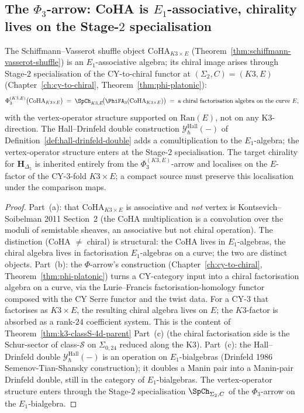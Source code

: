 \subsection{The \texorpdfstring{$\Phi_3$}{Phi-3}-arrow: CoHA is $E_1$-associative, chirality lives on the Stage-$2$ specialisation}
\label{subsec:kcb-phi-discipline}

\begin{theorem}
\label{thm:kcb-phi-arrow-discipline}
The Schiffmann--Vasserot shuffle object
$\mathrm{CoHA}_{K3\times E}$ (Theorem~\ref{thm:schiffmann-vasserot-shuffle})
is an $E_1$-associative algebra; its chiral image arises through
Stage-$2$ specialisation of the CY-to-chiral functor at
$(\Sigma_2, C) = (K3, E)$ (Chapter~\ref{ch:cy-to-chiral},
Theorem~\ref{thm:phi-platonic}):
\[
 \Phi_3^{(K3, E)}\bigl(\mathrm{CoHA}_{K3\times E}\bigr)
 \;=\;
 \SpCh_{K3, E}\!\bigl(\PhiFA_3(\mathrm{CoHA}_{K3\times E})\bigr)
 \;=\;
 \text{a chiral factorisation algebra on the curve }E,
\]
with the vertex-operator structure supported on $\mathrm{Ran}(E)$,
not on any K3-direction. The Hall--Drinfeld double construction
$\mathcal{Y}^{\mathrm{Hall}}_\hbar(-)$ of
Definition~\ref{def:hall-drinfeld-double} adds a comultiplication to
the $E_1$-algebra; the vertex-operator structure enters at the
Stage-$2$ specialisation. The target chirality for
$\mathbf{H}_{\Delta_5}$ is inherited entirely from the
$\Phi_3^{(K3, E)}$-arrow and localises on the $E$-factor of the
CY-$3$-fold $K3\times E$; a compact source must preserve this
localisation under the comparison maps.
\end{theorem}

\begin{proof}
Part~(a): that $\mathrm{CoHA}_{K3\times E}$ is associative and
\emph{not} vertex is Kontsevich--Soibelman 2011 Section~2 (the CoHA
multiplication is a convolution over the moduli of semistable
sheaves, an associative but not chiral operation). The distinction
(CoHA $\neq$ chiral) is structural: the CoHA lives in
$E_1$-algebras, the chiral algebra lives in factorisation
$E_1$-algebras on a curve; the two are distinct objects.
Part~(b): the $\Phi$-arrow's construction (Chapter~\ref{ch:cy-to-chiral},
Theorem~\ref{thm:phi-platonic}) turns a CY-category input into a
chiral factorisation algebra on a curve, via the Lurie--Francis
factorisation-homology functor composed with the CY Serre functor and
the twist data. For a CY-$3$ that factorises as $K3\times E$, the
resulting chiral algebra lives on $E$; the $K3$-factor is absorbed as
a rank-$24$ coefficient system. This is the content of
Theorem~\ref{thm:k3-classS-4d-parent} Part~(c) (the chiral
factorisation side is the Schur-sector of class-$\mathcal{S}$ on
$\Sigma_{0,24}$ reduced along the K3).
Part~(c): the Hall--Drinfeld double
$\mathcal{Y}^{\mathrm{Hall}}_\hbar(-)$ is an operation on
$E_1$-bialgebras (Drinfeld 1986 Semenov-Tian-Shansky construction);
it doubles a Manin pair into a Manin-pair Drinfeld double, still in
the category of $E_1$-bialgebras. The vertex-operator structure
enters through the Stage-$2$ specialisation $\SpCh_{\Sigma_2, C}$ of
the $\Phi_3$-arrow on the $E_1$-bialgebra.
\end{proof}

